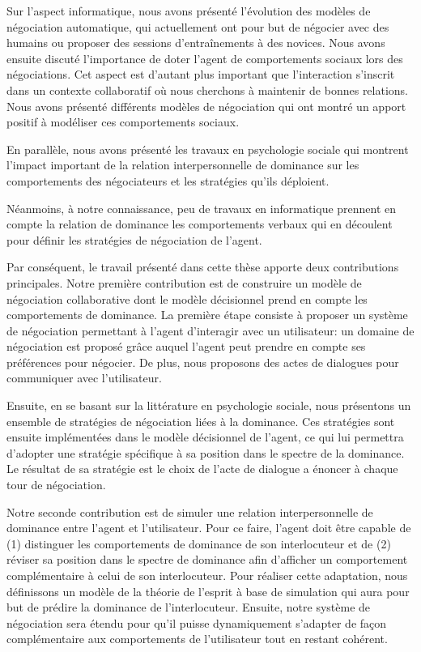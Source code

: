 			Sur l'aspect informatique, nous avons présenté l'évolution des modèles de négociation automatique, qui actuellement ont pour but de négocier avec des humains ou proposer des sessions d'entraînements à des novices. 			 
			Nous avons ensuite discuté l'importance de doter l'agent de comportements sociaux lors des négociations. Cet aspect est d'autant plus important que l'interaction s'inscrit dans un contexte collaboratif où nous cherchons à maintenir de bonnes relations. Nous avons présenté différents modèles de négociation qui ont montré un apport positif à modéliser ces comportements sociaux. 
			
			En parallèle, nous avons présenté les travaux en psychologie sociale qui montrent l'impact important de la relation interpersonnelle de dominance sur les comportements des négociateurs et les stratégies qu'ils déploient.
			
			Néanmoins, à notre connaissance, peu de travaux en informatique prennent en compte la relation de dominance les comportements verbaux qui en découlent pour définir les stratégies de négociation de l'agent.
			
			Par conséquent, le travail présenté dans cette thèse apporte deux contributions principales.
			Notre première contribution est de construire un modèle de négociation collaborative dont le modèle décisionnel prend en compte les comportements de dominance. 
			La première étape consiste à proposer un système de négociation permettant à l'agent d'interagir avec un utilisateur: un domaine de négociation est proposé grâce auquel l'agent peut prendre en compte ses préférences pour négocier. De plus, nous proposons des actes de dialogues pour communiquer avec l'utilisateur.
			
			Ensuite, en se basant sur la littérature en psychologie sociale, nous présentons un ensemble de stratégies de négociation liées à la dominance.
			Ces stratégies sont ensuite implémentées dans le modèle décisionnel de l'agent, ce qui lui permettra d'adopter une stratégie spécifique à sa position dans le spectre de la dominance.  Le résultat de sa stratégie est le choix de l'acte de dialogue a énoncer à chaque tour de négociation.
			
			Notre seconde contribution est de simuler une relation interpersonnelle de dominance entre l'agent et l'utilisateur. Pour ce faire, l'agent doit être capable de (1) distinguer les comportements de dominance de son interlocuteur et  de (2) réviser sa position dans le spectre de dominance afin  d'afficher un comportement complémentaire à celui de son interlocuteur. 
			Pour réaliser cette adaptation, nous définissons un modèle de la théorie de l'esprit à base de simulation qui aura pour but de prédire la dominance de l'interlocuteur. Ensuite, notre système de négociation sera étendu pour qu'il puisse dynamiquement s'adapter de façon complémentaire aux comportements de l'utilisateur tout en restant cohérent. 
		
		
	
	  